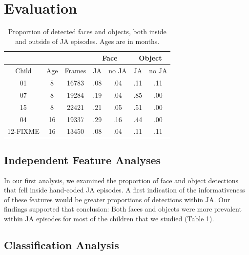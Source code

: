 \documentclass[10pt,letterpaper]{article}
\begin{document}
\section{Evaluation}



\begin{table}[t]
\centering
\begin{tabular}{ccc|cc|cc}
& & &\multicolumn{2}{c}{Face} & \multicolumn{2}{c}{Object} \\
\hline
Child & Age & Frames & JA & no JA & JA & no JA \\
\hline
01 &  8  & 16783&  .08 &  .04   &  .11  & .11 \\
07 &  8 & 19284& .19 & .04    &  .85  &  .00 \\
15 &   8 & 22421& .21 & .05    &  .51   & .00 \\
04 &  16 & 19337&  .29 & .16  &  .44   & .00  \\
12-FIXME& 16 & 13450 &    .08 &  .04   &  .11   & .11 \\
\hline
\end{tabular}
\caption{Proportion of detected faces and objects, both inside and outside of JA episodes. Ages are in months.}
\label{tb:Results2}
\end{table}

\subsection{Independent Feature Analyses}

In our first analysis, we examined the proportion of face and object detections that fell inside hand-coded JA episodes. A first indication of the informativeness of these features would be greater proportions of detections within JA. Our findings supported that conclusion: Both faces and objects were more prevalent within JA episodes for most of the children that we studied (Table \ref{tb:Results2}). 

\subsection{Classification Analysis}
\end{document}

